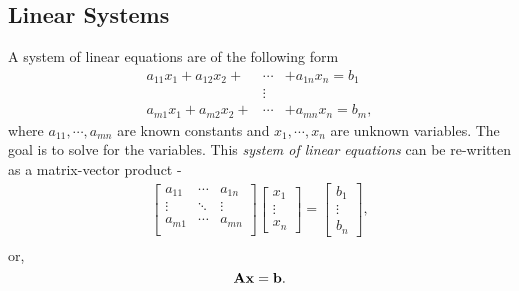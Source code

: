 \documentclass[linalg-review.tex]{subfiles}
\begin{document}
\subsection{Linear Systems}

\noindent


A system of linear equations are of the following form
\begin{eqnarray*}
    a_{11}x_{1} + a_{12}x_{2} + &\cdots& + a_{1n}x_{n} = b_{1} \\
    &\vdots& \\
    a_{m1}x_{1} + a_{m2}x_{2} + &\cdots& + a_{mn}x_{n} = b_{m}, 
\end{eqnarray*}
where $a_{11}, \cdots, a_{mn}$ are known constants and $x_{1}, \cdots, x_{n}$ are unknown variables. The goal is to solve for the variables. This \textit{system of linear equations} can be re-written as a matrix-vector product -
\begin{align*}
    \begin{bmatrix}
        a_{11} & \cdots & a_{1n} \\
        \vdots & \ddots & \vdots \\
        a_{m1} & \cdots & a_{mn} \\
    \end{bmatrix}
    \begin{bmatrix}
        x_{1} \\
        \vdots \\
        x_{n}
    \end{bmatrix} =
    \begin{bmatrix}
        b_{1} \\
        \vdots \\
        b_{n}
    \end{bmatrix}, \\
\end{align*}
or, 
\begin{equation}
    \mathbf{A} \mathbf{x} = \mathbf{b}.
\end{equation}
\end{document}
